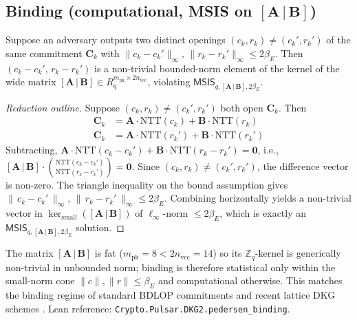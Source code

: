\subsection{Binding (computational, MSIS on $[\mathbf{A}\,|\,\mathbf{B}]$)}
\label{ssec:pedersen-binding}

\begin{proposition}[Binding]
\label{prop:pedersen-binding}
Suppose an adversary outputs two distinct openings
$(c_k, r_k)\neq(c_k', r_k')$ of the same commitment $\mathbf{C}_k$ with
$\|c_k-c_k'\|_\infty,\,\|r_k-r_k'\|_\infty\le 2\beta_E$. Then
$(c_k-c_k',\,r_k-r_k')$ is a non-trivial bounded-norm element of the
kernel of the wide matrix
$[\mathbf{A}\,|\,\mathbf{B}]\in R_q^{m_{\textrm{pk}}\times 2 n_{\textrm{vec}}}$,
violating
$\mathsf{MSIS}_{q,[\mathbf{A}\,|\,\mathbf{B}],2\beta_E}$.
\end{proposition}

\begin{proof}[Reduction outline]
Suppose $(c_k, r_k)\neq(c_k', r_k')$ both open $\mathbf{C}_k$. Then
\begin{align*}
\mathbf{C}_k &= \mathbf{A}\cdot\mathrm{NTT}(c_k)+\mathbf{B}\cdot\mathrm{NTT}(r_k) \\
\mathbf{C}_k &= \mathbf{A}\cdot\mathrm{NTT}(c_k')+\mathbf{B}\cdot\mathrm{NTT}(r_k')
\end{align*}
Subtracting,
$\mathbf{A}\cdot\mathrm{NTT}(c_k - c_k')+\mathbf{B}\cdot\mathrm{NTT}(r_k - r_k') = \mathbf{0}$,
i.e.,
$[\mathbf{A}\,|\,\mathbf{B}]\cdot\binom{\mathrm{NTT}(c_k-c_k')}{\mathrm{NTT}(r_k-r_k')} = \mathbf{0}$.
Since $(c_k, r_k)\neq(c_k', r_k')$, the difference vector is non-zero.
The triangle inequality on the bound assumption gives
$\|\,c_k - c_k'\,\|_\infty,\,\|\,r_k - r_k'\,\|_\infty\le 2\beta_E$.
Combining horizontally yields a non-trivial vector in
$\ker_{\textrm{small}}([\mathbf{A}\,|\,\mathbf{B}])$ of $\ell_\infty$-norm
$\le 2\beta_E$, which is exactly an
$\mathsf{MSIS}_{q,[\mathbf{A}\,|\,\mathbf{B}],2\beta_E}$ solution.
\end{proof}

The matrix $[\mathbf{A}\,|\,\mathbf{B}]$ is fat
($m_{\textrm{pk}} = 8 < 2 n_{\textrm{vec}} = 14$) so its
$\mathbb{Z}_q$-kernel is generically non-trivial in unbounded norm;
binding is therefore statistical only within the small-norm cone
$\|c\|,\|r\|\le\beta_E$ and computational otherwise. This matches the
binding regime of standard BDLOP commitments \cite{bdlop18} and recent
lattice DKG schemes \cite{gks24,krt24}. Lean reference:
\texttt{Crypto.Pulsar.DKG2.pedersen\_binding}.

